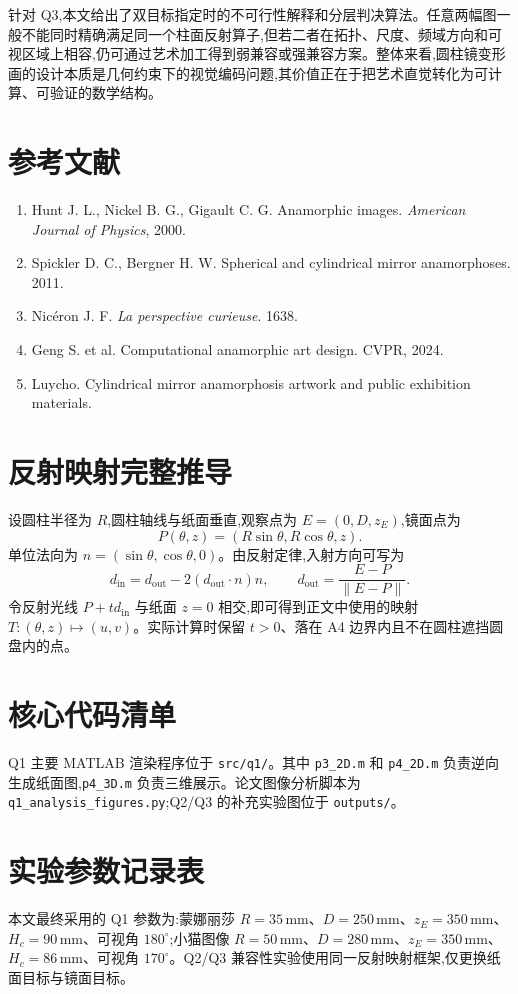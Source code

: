 \documentclass[12pt, a4paper]{ctexart}
\begin{document}
针对 Q3,本文给出了双目标指定时的不可行性解释和分层判决算法。任意两幅图一般不能同时精确满足同一个柱面反射算子,但若二者在拓扑、尺度、频域方向和可视区域上相容,仍可通过艺术加工得到弱兼容或强兼容方案。整体来看,圆柱镜变形画的设计本质是几何约束下的视觉编码问题,其价值正在于把艺术直觉转化为可计算、可验证的数学结构。

\section*{参考文献}
\begin{enumerate}
    \item Hunt J. L., Nickel B. G., Gigault C. G. Anamorphic images. \textit{American Journal of Physics}, 2000.
    \item Spickler D. C., Bergner H. W. Spherical and cylindrical mirror anamorphoses. 2011.
    \item Nicéron J. F. \textit{La perspective curieuse}. 1638.
    \item Geng S. et al. Computational anamorphic art design. CVPR, 2024.
    \item Luycho. Cylindrical mirror anamorphosis artwork and public exhibition materials.
\end{enumerate}

\appendix
\section{反射映射完整推导}
设圆柱半径为 $R$,圆柱轴线与纸面垂直,观察点为 $E=(0,D,z_E)$,镜面点为
\[
P(\theta,z)=(R\sin\theta,R\cos\theta,z).
\]
单位法向为 $n=(\sin\theta,\cos\theta,0)$。由反射定律,入射方向可写为
\[
d_{\mathrm{in}}=d_{\mathrm{out}}-2(d_{\mathrm{out}}\cdot n)n,\qquad
d_{\mathrm{out}}=\frac{E-P}{\|E-P\|}.
\]
令反射光线 $P+t d_{\mathrm{in}}$ 与纸面 $z=0$ 相交,即可得到正文中使用的映射 $T:(\theta,z)\mapsto(u,v)$。实际计算时保留 $t>0$、落在 A4 边界内且不在圆柱遮挡圆盘内的点。

\section{核心代码清单}
Q1 主要 MATLAB 渲染程序位于 \texttt{src/q1/}。其中 \texttt{p3\_2D.m} 和 \texttt{p4\_2D.m} 负责逆向生成纸面图,\texttt{p4\_3D.m} 负责三维展示。论文图像分析脚本为 \texttt{q1\_analysis\_figures.py};Q2/Q3 的补充实验图位于 \texttt{outputs/}。

\section{实验参数记录表}
本文最终采用的 Q1 参数为:蒙娜丽莎 $R=35\,\mathrm{mm}$、$D=250\,\mathrm{mm}$、$z_E=350\,\mathrm{mm}$、$H_c=90\,\mathrm{mm}$、可视角 $180^\circ$;小猫图像 $R=50\,\mathrm{mm}$、$D=280\,\mathrm{mm}$、$z_E=350\,\mathrm{mm}$、$H_c=86\,\mathrm{mm}$、可视角 $170^\circ$。Q2/Q3 兼容性实验使用同一反射映射框架,仅更换纸面目标与镜面目标。
\end{document}
